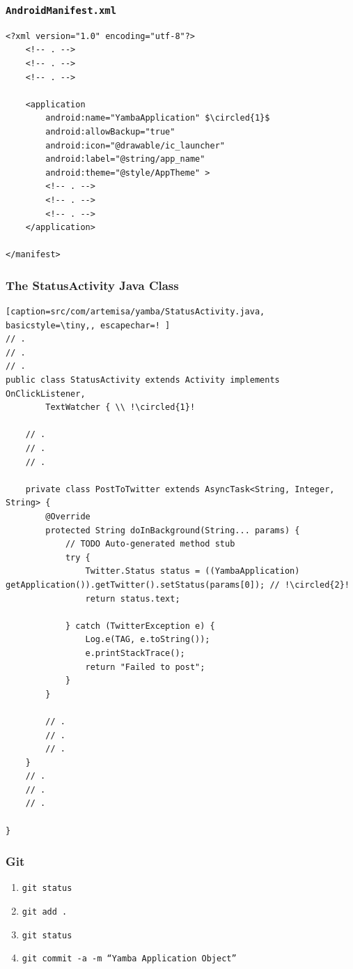 \begin{frame}
\frametitle{\texttt{AndroidManifest.xml}}
\lstset{language=XML, style=eclipse,breaklines=true,  basicstyle=\tiny,tabsize=2}
\begin{lstlisting}[caption=AndroidManifest.xml, basicstyle=\tiny,escapechar=$]
<?xml version="1.0" encoding="utf-8"?>
    <!-- . -->
    <!-- . -->
    <!-- . -->

    <application
        android:name="YambaApplication" $\circled{1}$
        android:allowBackup="true"
        android:icon="@drawable/ic_launcher"
        android:label="@string/app_name"
        android:theme="@style/AppTheme" >
        <!-- . -->
        <!-- . -->
        <!-- . -->
    </application>

</manifest>
\end{lstlisting}
\end{frame}
\begin{frame}
\frametitle{The StatusActivity Java Class}
\lstset{language=java, style=eclipse, breaklines=true, tabsize=2}
\centering
\begin{lstlisting}[caption=src/com/artemisa/yamba/StatusActivity.java, basicstyle=\tiny,, escapechar=! ]
// .
// .
// .
public class StatusActivity extends Activity implements OnClickListener,
		TextWatcher { \\ !\circled{1}!

	// .
	// .
	// .

	private class PostToTwitter extends AsyncTask<String, Integer, String> {
		@Override
		protected String doInBackground(String... params) {
			// TODO Auto-generated method stub
			try {
				Twitter.Status status = ((YambaApplication) getApplication()).getTwitter().setStatus(params[0]); // !\circled{2}!
				return status.text;

			} catch (TwitterException e) {
				Log.e(TAG, e.toString());
				e.printStackTrace();
				return "Failed to post";
			}
		}

		// .
		// .
		// .
	}
	// .
	// .
	// .
	
}

\end{lstlisting}
\end{frame}
\begin{frame}[fragile]
\frametitle{Git}
\begin{enumerate}
\item \texttt{git status}
\item \texttt{git add .}
\item \texttt{git status}
\item \texttt{git commit -a -m ``Yamba Application Object''}
\end{enumerate}

\end{frame}
